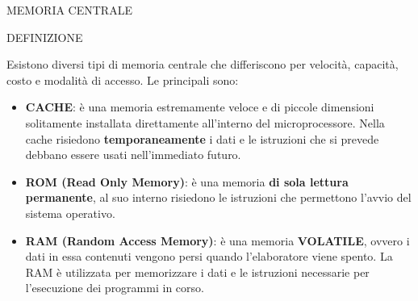 \documentclass[aspectratio=1610]{beamer}
\begin{document}
\begin{frame}{MEMORIA CENTRALE}
    \begin{alertblock}{DEFINIZIONE}
        \begin{minipage}{0.98\linewidth}
            \justifying
            Esistono diversi tipi di memoria centrale che differiscono per velocità, capacità, 
            costo e modalità di accesso. Le principali sono:
            \begin{itemize}
                \justifying
                \pause
                \item \textbf{CACHE}: è una memoria estremamente veloce e di piccole dimensioni solitamente 
                installata direttamente all'interno del microprocessore. Nella cache risiedono \textbf{temporaneamente} 
                i dati e le istruzioni che si prevede debbano essere usati nell'immediato futuro.
                \pause
                \item \textbf{ROM (Read Only Memory)}: è una memoria \textbf{di sola lettura permanente}, al suo interno 
                risiedono le istruzioni che permettono l'avvio del sistema operativo.
                \pause
                \item \textbf{RAM (Random Access Memory)}: è una memoria \textbf{VOLATILE}, ovvero i dati in essa contenuti 
                vengono persi quando l'elaboratore viene spento. La RAM è utilizzata per memorizzare i dati e 
                le istruzioni necessarie per l'esecuzione dei programmi in corso.
            \end{itemize}
        \end{minipage}
    \end{alertblock}
\end{frame}
\end{document}
